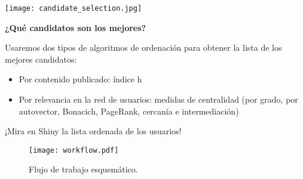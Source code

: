 \begin{minipage}{0.4\textwidth}
\texttt{[image: candidate\_selection.jpg]}
\end{minipage}\hfill
\begin{minipage}{0.55\textwidth}
{\bf\huge\color{oyellow} ¿Qué candidatos son los mejores?}
\medskip

\noindent Usaremos dos tipos de algoritmos de ordenación para obtener 
la lista de los mejores candidatos:
\begin{itemize}
\item Por contenido publicado: índice h
\item Por relevancia en la red de usuarios: medidas
de centralidad (por grado, por autovector, Bonacich, PageRank, cercanía e intermediación)
\end{itemize}
\noindent ¡Mira en Shiny la lista ordenada de los usuarios!
\end{minipage}




\begin{sidewaysfigure}
\texttt{[image: workflow.pdf]}
\caption{Flujo de trabajo esquemático.}
\label{fig:flujo_de_trabajo}
\end{sidewaysfigure}